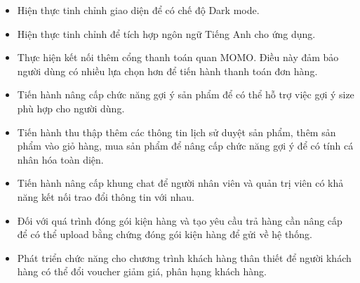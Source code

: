 \begin{itemize}
	\item Hiện thực tinh chỉnh giao diện để có chế độ Dark mode.
	\item Hiện thực tinh chỉnh để tích hợp ngôn ngữ Tiếng Anh cho ứng dụng.
	\item Thực hiện kết nối thêm cổng thanh toán quan MOMO. Điều này đảm bảo người dùng có nhiều lựa chọn hơn để tiến hành thanh toán đơn hàng.
	\item Tiến hành nâng cấp chức năng gợi ý sản phẩm để có thể hỗ trợ việc gợi ý size phù hợp cho người dùng.
	\item Tiến hành thu thập thêm các thông tin lịch sử duyệt sản phẩm, thêm sản phẩm vào giỏ hàng, mua sản phẩm để nâng cấp chức năng gợi ý để có tính cá nhân hóa toàn diện.
	\item Tiến hành nâng cấp khung chat để người nhân viên và quản trị viên có khả năng kết nối trao đổi thông tin với nhau.
	\item Đối với quá trình đóng gói kiện hàng và tạo yêu cầu trả hàng cần nâng cấp để có thể upload bằng chứng đóng gói kiện hàng để gửi về hệ thống.
	\item Phát triển chức năng cho chương trình khách hàng thân thiết để người khách hàng có thể đổi voucher giảm giá, phân hạng khách hàng.

\end{itemize}
